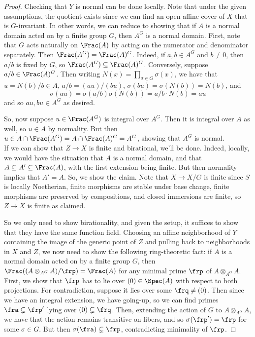 \begin{proof}
	Checking that $Y$ is normal can be done locally. Note that under the given assumptions, the quotient exists since we can find an open affine cover of $X$ that is $G$-invariant. In other words, we can reduce to showing that if $A$ is a normal domain acted on by a finite group $G$, then $A^G$ is a normal domain. First, note that $G$ acts naturally on $\Frac(A)$ by acting on the numerator and denominator separately. Then $\Frac(A^G) = \Frac(A)^G$. Indeed, if $a,b \in A^G$ and $b \neq 0$, then $a/b$ is fixed by $G$, so $\Frac(A^G) \subseteq \Frac(A)^G$. Conversely, suppose $a/b \in \Frac(A)^G$. Then writing $N(x) = \prod_{\sigma \in G} \sigma(x)$, we have that $u = N(b)/b \in A$, $a/b = (au)/(bu)$, $\sigma(bu) = \sigma(N(b)) = N(b)$, and
	\[ \sigma(au) = \sigma(a/b)\sigma(N(b)) = a/b \cdot N(b) = au \]
	and so $au,bu \in A^G$ as desired.
	
	So, now suppose $u \in \Frac(A^G)$ is integral over $A^G$. Then it is integral over $A$ as well, so $u \in A$ by normality. But then $u \in A \cap \Frac(A^G) = A \cap \Frac(A)^G = A^G$, showing that $A^G$ is normal. \\
	
	If we can show that $Z \to X$ is finite and birational, we'll be done. Indeed, locally, we would have the situation that $A$ is a normal domain, and that $A \subseteq A' \subseteq \Frac(A)$, with the first extension being finite. But then normality implies that $A' = A$. So, we show the claim. Note that $X \to X/G$ is finite since $S$ is locally Noetherian, finite morphisms are stable under base change, finite morphisms are preserved by compositions, and closed immersions are finite, so $Z \to X$ is finite as claimed.
	
	So we only need to show birationality, and given the setup, it suffices to show that they have the same function field. Choosing an affine neighborhood of $Y$ containing the image of the generic point of $Z$ and pulling back to neighborhoods in $X$ and $Z$, we now need to show the following ring-theoretic fact: if $A$ is a normal domain acted on by a finite group $G$, then $\Frac((A \otimes_{A^G} A)/\frp) = \Frac(A)$ for any minimal prime $\frp$ of $A \otimes_{A^G} A$. First, we show that $\frp$ has to lie over $(0) \in \Spec(A)$ with respect to both projections. For contradiction, suppose it lies over some $\frq \neq (0)$. Then since we have an integral extension, we have going-up, so we can find primes $\fra \subsetneq \frp'$ lying over $(0) \subsetneq \frq$. Then, extending the action of $G$ to $A \otimes_{A^G} A$, we have that the action remains transitive on fibers, and so $\sigma(\frp') = \frp$ for some $\sigma \in G$. But then $\sigma(\fra) \subsetneq \frp$, contradicting minimality of $\frp$.
	

\end{proof}
